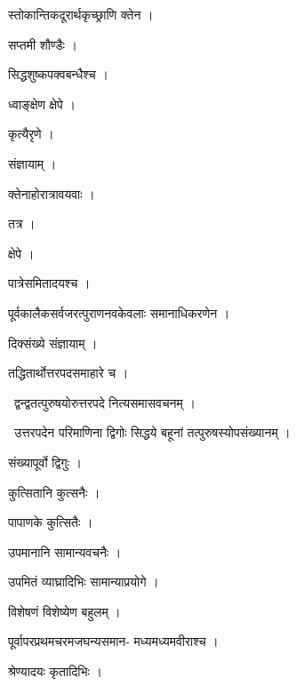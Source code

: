 \documentclass[10pt, openany, oneside]{book}
\begin{document}
\noindent स्तोकान्तिकदूरार्थकृच्छ्राणि क्तेन ।

\noindent सप्तमी शौण्डैः ।

\noindent सिद्धशुष्कपक्वबन्धैश्च ।

\noindent ध्वाङ्क्षेण क्षेपे ।

\noindent कृत्यैरृणे ।

\noindent संज्ञायाम् ।

\noindent क्तेनाहोरात्रावयवाः ।

\noindent तत्र ।

\noindent क्षेपे ।

\noindent पात्रेसमितादयश्च ।

\noindent पूर्वकालैकसर्वजरत्पुराणनवकेवलाः समानाधिकरणेन ।

\noindent दिक्संख्ये संज्ञायाम् ।

\noindent तद्धितार्थोत्तरपदसमाहारे च ।

\par\noindent\hspace{1.5em}{\vps वा॰}~{\qt द्वन्द्वतत्पुरुषयोरुत्तरपदे नित्यसमासवचनम् ।}

\par\noindent\hspace{1.5em}{\vps वा॰}~{\qt उत्तरपदेन परिमाणिना द्विगोः सिद्धये बहूनां तत्पुरुषस्योपसंख्यानम् ।}

\noindent संख्यापूर्वो द्विगुः ।

\noindent कुत्सितानि कुत्सनैः ।

\noindent पापाणके कुत्सितैः ।

\noindent उपमानानि सामान्यवचनैः ।

\noindent उपमितं व्याघ्रादिभिः सामान्याप्रयोगे ।

\noindent विशेषणं विशेष्येण बहुलम् ।

\noindent पूर्वापरप्रथमचरमजघन्यसमान- मध्यमध्यमवीराश्च ।

\noindent श्रेण्यादयः कृतादिभिः ।
\end{document}
